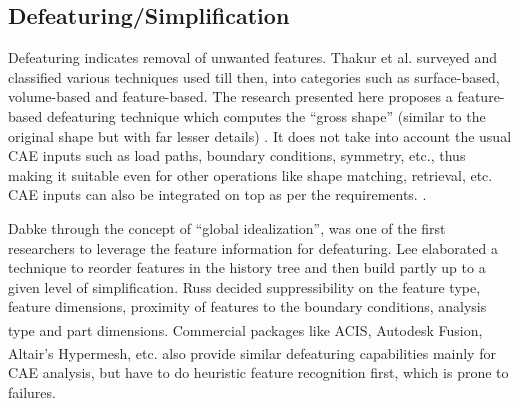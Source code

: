  
 \subsection{Defeaturing/Simplification}
 
Defeaturing indicates removal of unwanted features.  Thakur et al. \cite{Thakur2009} surveyed and classified various techniques used till then, into categories such as surface-based, volume-based and feature-based.  The research presented  here proposes a feature-based defeaturing technique which computes the ``gross shape'' (similar to the original shape but with far lesser details) \cite{YogeshIITM2013}. It does not take into account the usual CAE inputs such as load paths, boundary conditions, symmetry, etc., thus making it suitable even for other operations like shape matching, retrieval, etc. CAE inputs can also be integrated on top as per the requirements. .
 
Dabke \cite{Dabke1994} through the concept of ``global idealization'', was one of the first researchers to leverage the feature information for defeaturing.  Lee \cite{SangHunLee2005} elaborated a technique to reorder features in the history tree and then build partly up to a given level of simplification.  Russ \cite{Russ2012} decided suppressibility on the feature type, feature dimensions, proximity of features to the boundary conditions, analysis type and part dimensions. Commercial packages like ACIS\textsuperscript{\textregistered}, Autodesk Fusion\textsuperscript{\textregistered}, Altair's Hypermesh\textsuperscript{\textregistered},  etc. also provide similar defeaturing capabilities mainly for CAE analysis, but have to do heuristic feature recognition first, which is prone to failures.
	
